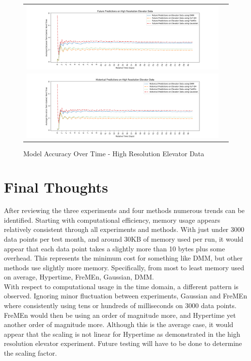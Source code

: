 \begin{center}
\begin{figure}[!Hp]
  \begin{tabular}{cc}
    {\includegraphics[width = 6in]{images/results/Future_Predictions_on_High_Resolution_Elevator_Data.png}} \\
    {\includegraphics[width = 6in]{images/results/Historical_Predictions_on_High_Resolution_Elevator_Data.png}} \\
  \end{tabular}
  \caption{Model Accuracy Over Time - High Resolution Elevator Data}
  \label{figure:Model_Accuracy_Over_Time_-_High_Resolution_Elevator_Data}
\end{figure}
\end{center}


\section{ Final Thoughts }

After reviewing the three experiments and four methods numerous trends can be
identified. Starting with computational efficiency, memory usage appears
relatively consistent through all experiments and methods. With just under 3000
data points per test month, and around 30KB of memory used per run,
it would appear that each data point takes a slightly more than 10 bytes plus
some overhead. This represents the minimum cost for something like DMM, but
other methods use slightly more memory. Specifically, from most to least memory
used on average, Hypertime, FreMEn, Gaussian, DMM. \\

With respect to computational usage in the time domain, a different pattern is
observed. Ignoring minor fluctuation between experiments, Gaussian and FreMEn
where consistently using tens or hundreds of milliseconds on 3000 data points.
FreMEn would then be using an order of magnitude more, and Hypertime yet another
order of magnitude more. Although this is the average case, it would appear that
the scaling is not linear for Hypertime as demonstrated in the high resolution
elevator experiment. Future testing will have to be done to determine the
scaling factor. \\


